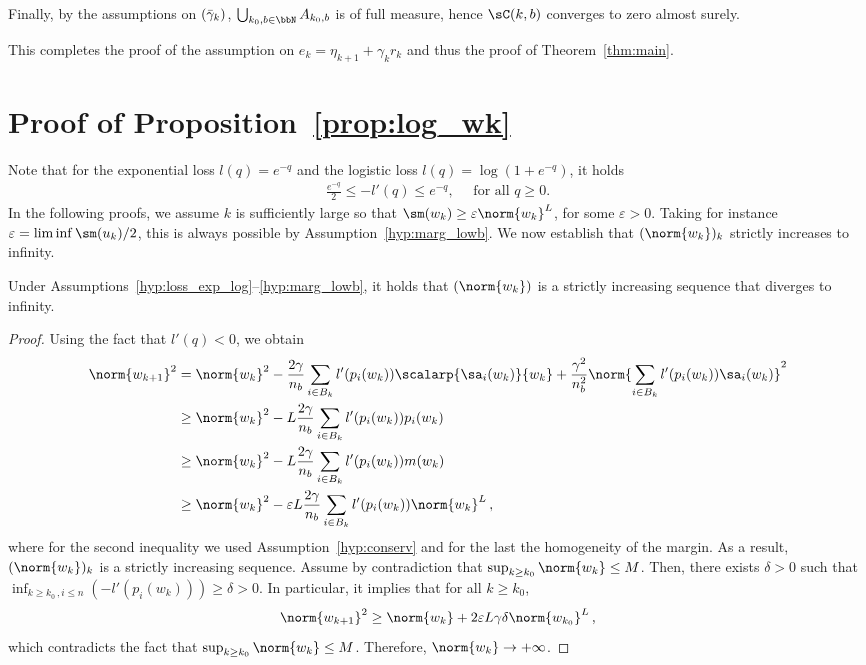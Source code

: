 Finally, by the assumptions on $(\bar{\gamma}_k)$, $\bigcup_{k_{0}, b\in \bbN}A_{k_{0},b}$ is of full measure, hence $\sC(k,b)$ converges to zero almost surely.

This completes the proof of the assumption on $e_k = \eta_{k+1} + \gamma_k r_k$ and thus the proof of Theorem~\ref{thm:main}. 

\section{Proof of Proposition~\ref{prop:log_wk}}\label{sec:pf_logwk}

Note that for the exponential loss $l(q)=  e^{-q}$ and the logistic loss $l(q) = \log(1+ e^{-q})$, it holds 
\begin{align}\label{lm:exp_log}
\frac{e^{-q}}{2}\leq -l'(q) \leq e^{-q}, \quad \text{ for all } q \geq 0.
\end{align}
In the following proofs, we assume $k$ is sufficiently large so that $\sm(w_{k}) \geq \varepsilon \norm{w_k}^L$, for some $\varepsilon >0$. Taking for instance $\varepsilon = \liminf \sm(u_k)/2$, this is always possible by Assumption~\ref{hyp:marg_lowb}. We now establish that $(\norm{w_k})_k$ strictly increases to infinity.
\begin{lemma}\label{lm:wk_infty}
  Under Assumptions~\ref{hyp:loss_exp_log}--\ref{hyp:marg_lowb}, it holds that $(\norm{w_k})$ is a strictly increasing sequence that diverges to infinity.
\end{lemma}
\begin{proof}
  Using the fact that $l'(q) <0$, we obtain
  \begin{equation*}
  \begin{split}
    \norm{w_{k+1}}^2 &= \norm{w_k}^2 - \frac{2\gamma}{n_b} \sum_{i\in B_k} l'(p_i(w_k)) \scalarp{\sa_i(w_k)}{w_k} + \frac{\gamma^2}{n_b^2} \norm{\sum_{i\in B_k}l'(p_i(w_k)) \sa_i(w_k)}^2 \\
    &\geq \norm{w_k}^2 - L\frac{2\gamma}{n_b} \sum_{i\in B_k} l'(p_i(w_k)) p_i(w_k) \\
    &\geq \norm{w_k}^2 - L \frac{2\gamma}{n_b} \sum_{i\in B_k} l'(p_i(w_k)) m(w_k) \\
    &\geq \norm{w_k}^2 - \varepsilon L \frac{2\gamma}{n_b} \sum_{i \in B_k} l'(p_i(w_k))\norm{w_k}^L\, ,
  \end{split}
\end{equation*}
where for the second inequality we used Assumption~\ref{hyp:conserv} and for the last the homogeneity of the margin.
As a result, $(\norm{w_k})_k$ is a strictly increasing sequence. Assume by contradiction that $\sup_{k \geq k_0} \norm{w_k} \leq M$. Then, there exists $\delta > 0$ such that $\inf_{k \geq k_0\, , i \leq n} (-l'(p_i(w_k))) \geq \delta >0$. In particular, it implies that for all $k \geq k_0$,
\begin{equation*}
  \norm{w_{k+1}}^2 \geq \norm{w_k} + 2\varepsilon L \gamma \delta \norm{w_{k_0}}^L\, ,
\end{equation*}
which contradicts the fact that $\sup_{k \geq k_0} \norm{w_k} \leq M$. Therefore, $\norm{w_k} \rightarrow + \infty$.
\end{proof}
